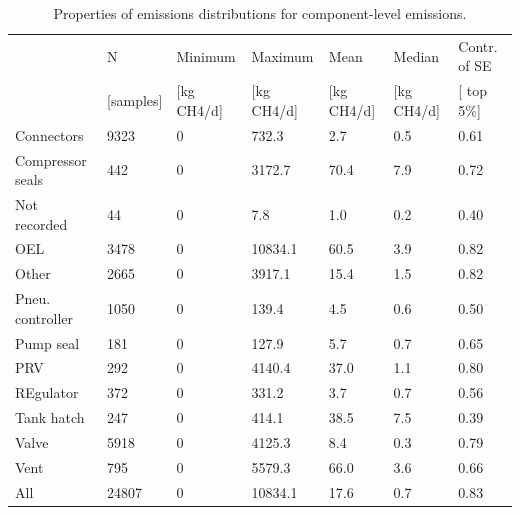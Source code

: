 \documentclass[11pt]{report}
\begin{document}
\begin{table}
\begin{scriptsize}
\caption{Properties of emissions distributions for component-level emissions.}
\label{tab:emission_dist_component}
\begin{tabular*}{1\columnwidth}{llllllp{}}
\toprule
			&	N                     & Minimum               & Maximum            & Mean           & Median         & Contr. of SE                                 \\
                     	 & {[}samples{]} & {[}kg CH4/d{]} & {[}kg CH4/d{]} & {[}kg CH4/d{]} & {[}kg CH4/d{]}                   & {[} top 5\%{]} \\
	 \midrule
Connectors       & 9323  & 0   & 732.3   & 2.7    & 0.5                  & 0.61 \\
Compressor seals & 442   & 0   & 3172.7  & 70.4   & 7.9                  & 0.72 \\
Not recorded     & 44    & 0   & 7.8     & 1.0    & 0.2                  & 0.40 \\
OEL              & 3478  & 0   & 10834.1 & 60.5   & 3.9                  & 0.82 \\
Other            & 2665  & 0   & 3917.1  & 15.4   & 1.5                  & 0.82 \\
Pneu. controller & 1050  & 0   & 139.4   & 4.5    & 0.6                  & 0.50 \\
Pump seal        & 181   & 0   & 127.9   & 5.7    & 0.7                  & 0.65 \\
PRV              & 292   & 0   & 4140.4  & 37.0   & 1.1                  & 0.80 \\
REgulator        & 372   & 0   & 331.2   & 3.7    & 0.7                  & 0.56 \\
Tank hatch       & 247   & 0   & 414.1   & 38.5   & 7.5                  & 0.39 \\
Valve            & 5918  & 0   & 4125.3  & 8.4    & 0.3                  & 0.79 \\
Vent             & 795   & 0   & 5579.3  & 66.0   & 3.6                  & 0.66 \\
All              & 24807 & 0   & 10834.1 & 17.6   & 0.7                  & 0.83\\
\bottomrule
\end{tabular*}
\end{scriptsize}
\end{table}
\end{document}
